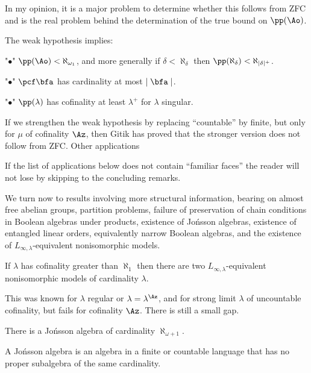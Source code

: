 In my opinion, it is a major problem to determine
whether this follows
from ZFC and is the real problem behind the
determination of the true
bound on $\pp(\Ao)$.
 
The weak hypothesis implies\RM:
\roster
\item"$\bullet$"
$\pp(\Ao)<\aleph_{\omega_1}$, and
more generally if $\delta<\aleph_\delta$ then 
$\pp(\aleph_\delta)<\aleph_{\mid \delta\mid ^+}$.
\item"$\bullet$"
$\pcf\bfa$ has cardinality at most $\mid \bfa\mid $.
\item"$\bullet$" $\pp(\lambda)$ has cofinality at least 
$\lambda^+$
for $\lambda$ singular.
\endroster
\endproclaim
 
If we strengthen the weak hypothesis by replacing 
``countable'' by
finite, but only for $\mu$ of cofinality $\Az$,  then
Gitik has proved that the stronger version does not follow 
from ZFC.
{} Other applications\endheading
 
If the list of applications below does not contain 
``familiar faces'' the
reader will not lose by
skipping to the concluding remarks.
 
We turn now to results involving more structural 
information, bearing
on almost free abelian groups, partition problems, failure 
of
preservation of chain conditions in Boolean algebras under 
products,
existence of Jo\'nsson algebras, existence of entangled 
linear orders,
equivalently 
narrow Boolean algebras,
and the existence of $L_{\infty,\lambda}$-equivalent 
nonisomorphic models.
 
If $\lambda$ has cofinality greater than $\aleph_1$ then 
there are two
$L_{\infty,\lambda}$-equivalent nonisomorphic models of 
cardinality
$\lambda$.
\endproclaim
 
This was known for $\lambda$ regular or 
$\lambda=\lambda^\Az$, and
for strong limit $\lambda$ of uncountable cofinality, but
fails for cofinality $\Az$. There is still a small gap.
 
There is a Jo\'nsson algebra of cardinality 
$\aleph_{\omega+1}$.
\endproclaim

A Jo\'nsson algebra is an algebra in a finite or countable 
language
that has no proper subalgebra of the same cardinality.
 
